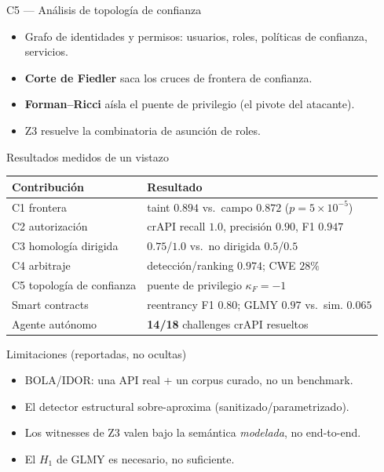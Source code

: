 \documentclass[aspectratio=169,11pt]{beamer}
\begin{document}
\begin{frame}{C5 --- Análisis de topología de confianza}
  \begin{itemize}
    \item Grafo de identidades y permisos: usuarios, roles, políticas de confianza, servicios.
    \item \textbf{Corte de Fiedler} saca los cruces de frontera de confianza.
    \item \textbf{Forman--Ricci} aísla el puente de privilegio (el pivote del atacante).
    \item Z3 resuelve la combinatoria de asunción de roles.
  \end{itemize}
\end{frame}

\begin{frame}{Resultados medidos de un vistazo}
  \begin{center}
  \begin{tabular}{ll}
  \toprule
  \textbf{Contribución} & \textbf{Resultado} \\
  \midrule
  C1 frontera & taint $0.894$ vs.\ campo $0.872$ ($p=5\times10^{-5}$) \\
  C2 autorización & crAPI recall $1.0$, precisión $0.90$, F1 $0.947$ \\
  C3 homología dirigida & $0.75$/$1.0$ vs.\ no dirigida $0.5$/$0.5$ \\
  C4 arbitraje & detección/ranking $0.974$; CWE $28\%$ \\
  C5 topología de confianza & puente de privilegio $\kappa_F=-1$ \\
  Smart contracts & reentrancy F1 $0.80$; GLMY $0.97$ vs.\ sim. $0.065$ \\
  Agente autónomo & \textbf{14/18} challenges crAPI resueltos \\
  \bottomrule
  \end{tabular}
  \end{center}
\end{frame}

\begin{frame}{Limitaciones (reportadas, no ocultas)}
  \begin{itemize}
    \item BOLA/IDOR: una API real + un corpus curado, no un benchmark.
    \item El detector estructural sobre-aproxima (sanitizado/parametrizado).
    \item Los witnesses de Z3 valen bajo la semántica \emph{modelada}, no end-to-end.
    \item El $H_1$ de GLMY es necesario, no suficiente.
  \end{itemize}
\end{frame}
\end{document}
